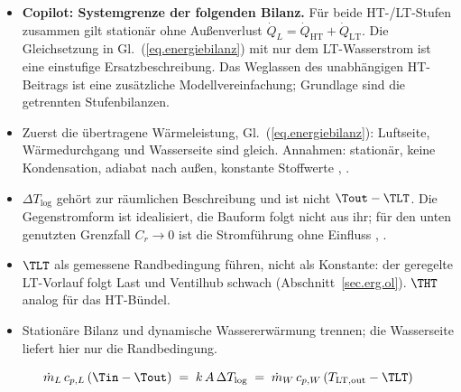 \begin{itemize}
  \item \textbf{Copilot: Systemgrenze der folgenden Bilanz.}
    Für beide HT-/LT-Stufen zusammen gilt stationär ohne Außenverlust
    $\dot Q_L=\dot Q_{\mathrm{HT}}+\dot Q_{\mathrm{LT}}$.
    Die Gleichsetzung in Gl.~(\ref{eq.energiebilanz}) mit nur dem
    LT-Wasserstrom ist eine einstufige Ersatzbeschreibung.
    Das Weglassen des unabhängigen HT-Beitrags ist eine zusätzliche
    Modellvereinfachung; Grundlage sind die getrennten Stufenbilanzen.
\end{itemize}
\begin{itemize}
  \item Zuerst die übertragene Wärmeleistung, Gl.~(\ref{eq.energiebilanz}):
    Luftseite, Wärmedurchgang und Wasserseite sind gleich. Annahmen: stationär,
    keine Kondensation, adiabat nach außen, konstante Stoffwerte
    \cite[S.~838, Gl.~31.57--31.59]{almbauerThermomanagement2019},
    \cite[S.~256, Gl.~12.7]{pucherLadeluftkuehlungUndLadeluftkuehler2012}.
  \item $\Delta T_{\log}$ gehört zur räumlichen Beschreibung und ist nicht
    $\Tout - \TLT$. Die Gegenstromform ist idealisiert, die Bauform folgt nicht
    aus ihr; für den unten genutzten Grenzfall $C_r \to 0$ ist die Stromführung
    ohne Einfluss \cite[S.~3258 und 3264]{yinAnalyticModelTransient2003},
    \cite[Gl.~31.64]{almbauerThermomanagement2019}.
  \item $\TLT$ als gemessene Randbedingung führen, nicht als Konstante: der
    geregelte LT-Vorlauf folgt Last und Ventilhub schwach
    (Abschnitt~\ref{sec.erg.ol}). $\THT$ analog für das HT-Bündel.
  \item Stationäre Bilanz und dynamische Wassererwärmung trennen; die Wasserseite
    liefert hier nur die Randbedingung.
\end{itemize}

\begin{equation}
  \label{eq.energiebilanz}
  \dot m_L\,c_{p,L}\,(\Tin - \Tout)
  \;=\; k\,A\,\Delta T_{\log}
  \;=\; \dot m_W\,c_{p,W}\,(T_{\mathrm{LT,out}} - \TLT)
\end{equation}

